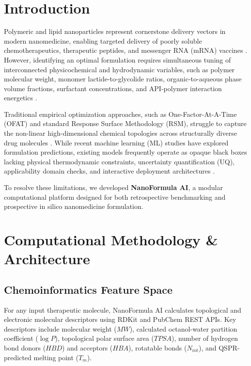 \documentclass[twocolumn,10pt,3p]{elsarticle}
\begin{document}
\section{Introduction}
Polymeric and lipid nanoparticles represent cornerstone delivery vectors in modern nanomedicine, enabling targeted delivery of poorly soluble chemotherapeutics, therapeutic peptides, and messenger RNA (mRNA) vaccines \cite{khalil2013curcumin, danhier2009paclitaxel}. However, identifying an optimal formulation requires simultaneous tuning of interconnected physicochemical and hydrodynamic variables, such as polymer molecular weight, monomer lactide-to-glycolide ratios, organic-to-aqueous phase volume fractions, surfactant concentrations, and API-polymer interaction energetics \cite{kumari2010biodegradable}.

Traditional empirical optimization approaches, such as One-Factor-At-A-Time (OFAT) and standard Response Surface Methodology (RSM), struggle to capture the non-linear high-dimensional chemical topologies across structurally diverse drug molecules \cite{tropsha2010best}. While recent machine learning (ML) studies have explored formulation predictions, existing models frequently operate as opaque black boxes lacking physical thermodynamic constraints, uncertainty quantification (UQ), applicability domain checks, and interactive deployment architectures \cite{sanna2014resveratrol}.

To resolve these limitations, we developed \textbf{NanoFormula AI}, a modular computational platform designed for both retrospective benchmarking and prospective in silico nanomedicine formulation.

\section{Computational Methodology \& Architecture}

\subsection{Chemoinformatics Feature Space}
For any input therapeutic molecule, NanoFormula AI calculates topological and electronic molecular descriptors using RDKit and PubChem REST APIs. Key descriptors include molecular weight ($MW$), calculated octanol-water partition coefficient ($\log P$), topological polar surface area ($TPSA$), number of hydrogen bond donors ($HBD$) and acceptors ($HBA$), rotatable bonds ($N_{\text{rot}}$), and QSPR-predicted melting point ($T_m$).
\end{document}
